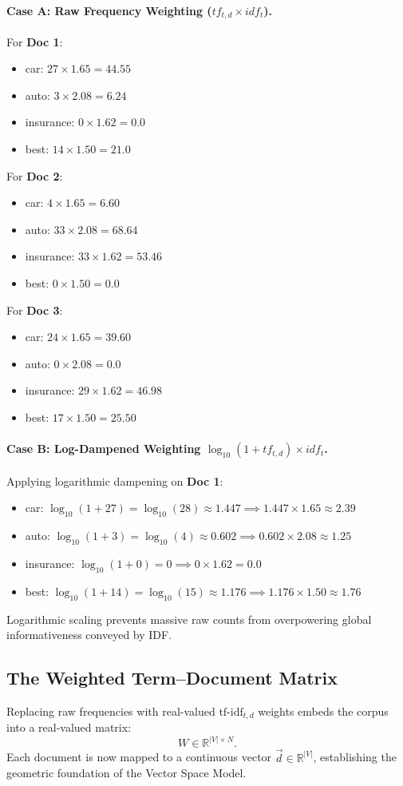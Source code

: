 \paragraph{Case A: Raw Frequency Weighting ($tf_{t,d} \times idf_t$).}
For \textbf{Doc 1}:
\begin{itemize}
    \item car: $27 \times 1.65 = 44.55$
    \item auto: $3 \times 2.08 = 6.24$
    \item insurance: $0 \times 1.62 = 0.0$
    \item best: $14 \times 1.50 = 21.0$
\end{itemize}
For \textbf{Doc 2}:
\begin{itemize}
    \item car: $4 \times 1.65 = 6.60$
    \item auto: $33 \times 2.08 = 68.64$
    \item insurance: $33 \times 1.62 = 53.46$
    \item best: $0 \times 1.50 = 0.0$
\end{itemize}
For \textbf{Doc 3}:
\begin{itemize}
    \item car: $24 \times 1.65 = 39.60$
    \item auto: $0 \times 2.08 = 0.0$
    \item insurance: $29 \times 1.62 = 46.98$
    \item best: $17 \times 1.50 = 25.50$
\end{itemize}

\paragraph{Case B: Log-Dampened Weighting $\log_{10}(1 + tf_{t,d}) \times idf_t$.}
Applying logarithmic dampening on \textbf{Doc 1}:
\begin{itemize}
    \item car: $\log_{10}(1 + 27) = \log_{10}(28) \approx 1.447 \implies 1.447 \times 1.65 \approx \mathbf{2.39}$
    \item auto: $\log_{10}(1 + 3) = \log_{10}(4) \approx 0.602 \implies 0.602 \times 2.08 \approx \mathbf{1.25}$
    \item insurance: $\log_{10}(1 + 0) = 0 \implies 0 \times 1.62 = \mathbf{0.0}$
    \item best: $\log_{10}(1 + 14) = \log_{10}(15) \approx 1.176 \implies 1.176 \times 1.50 \approx \mathbf{1.76}$
\end{itemize}
Logarithmic scaling prevents massive raw counts from overpowering global informativeness conveyed by IDF.

\subsection{The Weighted Term--Document Matrix}
Replacing raw frequencies with real-valued $\text{tf-idf}_{t,d}$ weights embeds the corpus into a real-valued matrix:
\begin{equation}
W \in \mathbb{R}^{|V| \times N}.
\end{equation}
Each document is now mapped to a continuous vector $\vec{d} \in \mathbb{R}^{|V|}$, establishing the geometric foundation of the Vector Space Model.
